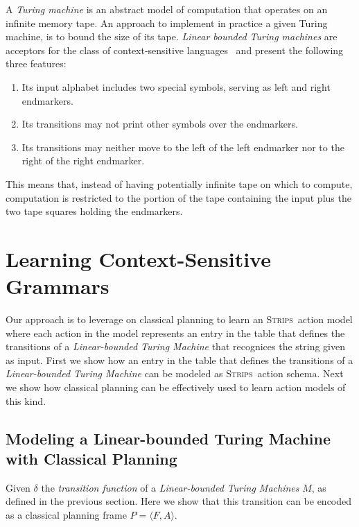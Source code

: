 \documentclass[letterpaper]{article} %
\newcommand{\tup}[1]{{\langle #1 \rangle}}
\newcommand{\strips}{\textsc{Strips}}     %
\begin{document}
A {\em Turing machine} is an abstract model of computation that operates on an infinite memory tape. An approach to implement in practice a given Turing machine, is to bound the size of its tape. {\em Linear bounded Turing machines} are acceptors for the class of context-sensitive languages~\cite{hopcroft:automatatheory:2001} and present the following three features:
\begin{enumerate}
\item Its input alphabet includes two special symbols, serving as left and right endmarkers.
\item Its transitions may not print other symbols over the endmarkers.
\item Its transitions may neither move to the left of the left endmarker nor to the right of the right endmarker.
\end{enumerate}
This means that, instead of having potentially infinite tape on which to compute, computation is restricted to the portion of the tape containing the input plus the two tape squares holding the endmarkers.



\section{Learning Context-Sensitive Grammars}

Our approach is to leverage on classical planning to learn an \strips\ action model where each action in the model represents an entry in the table that defines the transitions of a {\em Linear-bounded Turing Machine} that recognices the string given as input. First we show how an entry in the table that defines the transitions of a {\em Linear-bounded Turing Machine} can be modeled as \strips\ action schema. Next we show how classical planning can be effectively used to learn action models of this kind.

\subsection{Modeling a Linear-bounded Turing Machine with Classical Planning}
Given $\delta$ the {\em transition function} of a {\em Linear-bounded Turing Machines} $M$, as defined in the previous section. Here we show that this transition can be encoded as a classical planning frame $P=\tup{F,A}$.
\end{document}
